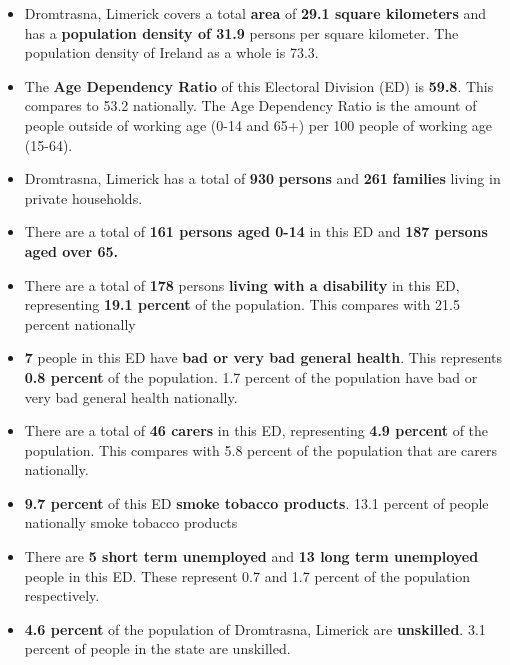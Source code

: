 \documentclass{article}
\begin{document}
\begin{itemize}

\item Dromtrasna, Limerick covers a total \textbf{area} of  \textbf{29.1 square kilometers} and has a \textbf{population density of 31.9} persons per square kilometer. The population density of Ireland as a whole is  73.3. 

\item The \textbf{Age Dependency Ratio} of this Electoral Division (ED) is  \textbf{59.8}. This compares to 53.2 nationally. The Age Dependency Ratio is the amount of people outside of working age (0-14 and 65+) per 100 people of working age (15-64). 

\item Dromtrasna, Limerick has a total of \textbf{930} \textbf{persons} and  \textbf{261} \textbf{families} living in private households.

\item There are a total of \textbf{161 persons aged 0-14} in this ED and \textbf{187 persons aged over 65.} 

\item There are a total of \textbf{178} persons \textbf{living with a disability} in this ED, representing \textbf{19.1 percent} of the population. This compares with  21.5 percent nationally

\item \textbf{7} people in this ED have \textbf{bad or very bad general health}. This represents \textbf{0.8 percent} of the population. 1.7 percent of the population have bad or very bad general health nationally. 

\item There are a total of \textbf{46 carers} in this ED, representing \textbf{4.9 percent} of the population. This compares with 5.8 percent of the population that are carers nationally. 

\item \textbf{9.7 percent} of this ED \textbf{smoke tobacco products}. 13.1 percent of people nationally smoke tobacco products

\item There are \textbf{5 short term unemployed} and \textbf{13 long term unemployed} people in this ED. These represent 0.7 and 1.7 percent of the population respectively.

\item  \textbf{4.6 percent} of the population of Dromtrasna, Limerick are \textbf{unskilled}. 3.1 percent of people in the state are unskilled.


\end{itemize}
\end{document}
